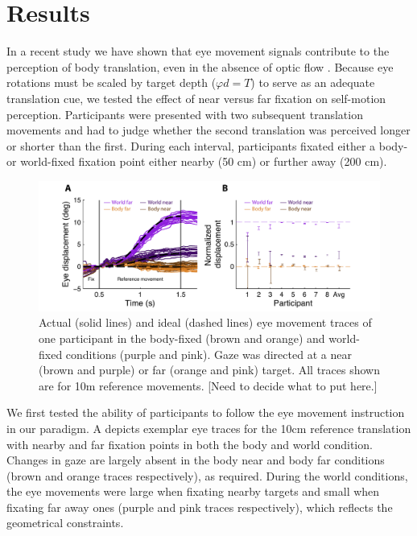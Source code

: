 \section{Results}

In a recent study we have shown that eye movement signals contribute to the perception of body translation, even in the absence of optic flow \cite{clemens2015a}. Because eye rotations must be scaled by target depth ($\varphi d = T$) to serve as an adequate translation cue, we tested the effect of near versus far fixation on self-motion perception. Participants were presented with two subsequent translation movements  and had to judge whether the second translation was perceived longer or shorter than the first. During each interval, participants fixated either a body- or world-fixed fixation point either nearby (50 cm) or further away (200 cm).

\begin{figure}
    \includegraphics[width=1.0\textwidth]{src/paper4/p4_figure2.pdf}

    \caption{ Actual (solid lines) and ideal (dashed lines) eye movement traces of one participant in the body-fixed (brown and orange) and world-fixed conditions (purple and pink). Gaze was directed at a near (brown and purple) or far (orange and pink) target. All traces shown are for 10m reference movements.  [Need to decide what to put here.]}
    \label{p4:fig2}
\end{figure}

We first tested the ability of participants to follow the eye movement instruction in our paradigm. A depicts exemplar eye traces for the 10cm reference translation with nearby and far fixation points in both the body and world condition. Changes in gaze are largely absent in the body near and body far conditions (brown and orange traces respectively), as required. During the world conditions, the eye movements were large when fixating nearby targets and small when fixating far away ones (purple and pink traces respectively), which reflects the geometrical constraints. 

